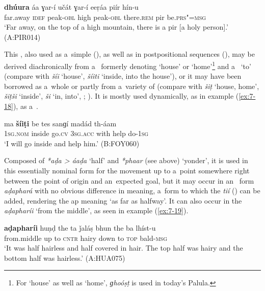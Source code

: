 \begin{exe}
\ex
\label{ex:7-17b}
\gll \textbf{dhúura} áa ɣar-í učát ɣar-í eeṛáa piír hín-u \\
far.away \textsc{idef} peak-\textsc{obl} high peak-\textsc{obl} there.\textsc{rem} pir be.\textsc{prs"=msg}\\
\glt `Far away, on the top of a high mountain, there is a pir [a holy person].' (A:PIR014)
\end{exe}


 This , also used as a~simple 
(), as well as in postpositional sequences (), may be derived diachronically from
a~ formerly denoting `house' or `home'\footnote{For `house' as well as `home',
  \textit{ɡhoóṣṭ} is used in today's Palula.} and a~ `to' (compare with \iliKalkoti
\textit{šíi} `house', \textit{šíiti} `inside, into the house'), or it may have been borrowed
as a~whole or partly from a~variety of \iliKohistani (compare with \iliGawri \textit{šiṭ} `house, home',
\textit{šiṭši} `inside', \textit{ši} `in, into', \citealt[119]{baart1997}; \citeyear[76]{baart1999a}). It is mostly used
dynamically, as in example (\ref{ex:7-18}), as a~.

\begin{exe}
\ex
\label{ex:7-18}
\gll ma \textbf{šíiṭi} be tes sanɡí madád th-áam \\
\textsc{1sg.nom} inside go.\textsc{cv} \textsc{3sg.acc} with help do-\textsc{1sg}\\
\glt `I will go inside and help him.' (B:FOY060)
\end{exe}

 Composed of \textit{*aḍa {\textgreater} áaḍa} `half' and \textit{*phaar} (see above) `yonder', it is used in this essentially nominal form for the movement up to a~point somewhere right between the point of origin and an~expected goal, but it may occur in an~ form \textit{aḍaphará} with no obvious difference in meaning, a~form to which the  \textit{tií} () can be added, rendering the ap meaning `as far as halfway'. It can also occur in the  \textit{aḍapharíi} `from the middle', as seen in example (\ref{ex:7-19}). 
\begin{exe}
\ex
\label{ex:7-19}
\gll \textbf{aḍapharíi} huṇḍ the ta ǰaláṣ bhun the ba lhíst-u \\
from.middle up to \textsc{cntr} hairy down to \textsc{top} bald-\textsc{msg}\\
\glt `It was half hairless and half covered in hair. The top half was hairy and the bottom half was hairless.' (A:HUA075)
\end{exe}

